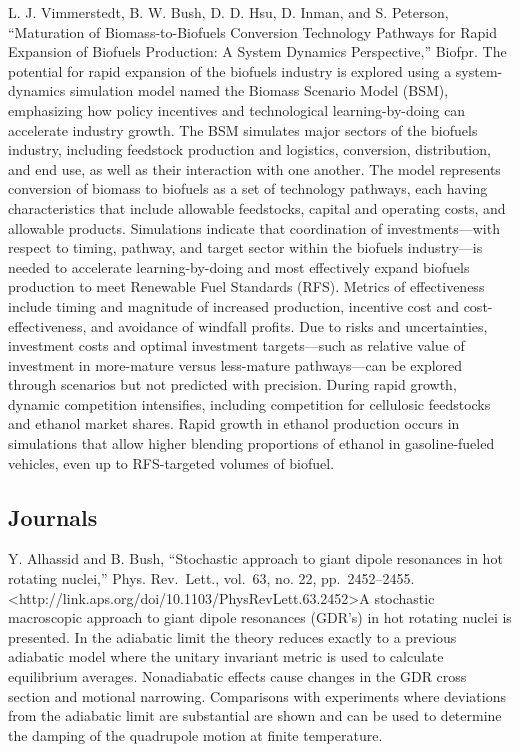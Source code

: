 \documentclass[]{article}
\begin{document}
L. J. Vimmerstedt, B. W. Bush, D. D. Hsu, D. Inman, and S. Peterson,
``Maturation of Biomass-to-Biofuels Conversion Technology Pathways for
Rapid Expansion of Biofuels Production: A System Dynamics Perspective,''
Biofpr. The potential for rapid expansion of the biofuels industry is
explored using a system-dynamics simulation model named the Biomass
Scenario Model (BSM), emphasizing how policy incentives and
technological learning-by-doing can accelerate industry growth. The BSM
simulates major sectors of the biofuels industry, including feedstock
production and logistics, conversion, distribution, and end use, as well
as their interaction with one another. The model represents conversion
of biomass to biofuels as a set of technology pathways, each having
characteristics that include allowable feedstocks, capital and operating
costs, and allowable products. Simulations indicate that coordination of
investments---with respect to timing, pathway, and target sector within
the biofuels industry---is needed to accelerate learning-by-doing and
most effectively expand biofuels production to meet Renewable Fuel
Standards (RFS). Metrics of effectiveness include timing and magnitude
of increased production, incentive cost and cost-effectiveness, and
avoidance of windfall profits. Due to risks and uncertainties,
investment costs and optimal investment targets---such as relative value
of investment in more-mature versus less-mature pathways---can be
explored through scenarios but not predicted with precision. During
rapid growth, dynamic competition intensifies, including competition for
cellulosic feedstocks and ethanol market shares. Rapid growth in ethanol
production occurs in simulations that allow higher blending proportions
of ethanol in gasoline-fueled vehicles, even up to RFS-targeted volumes
of biofuel.

\subsection{Journals}\label{journals}

Y. Alhassid and B. Bush, ``Stochastic approach to giant dipole
resonances in hot rotating nuclei,'' Phys. Rev.~Lett., vol.~63, no. 22,
pp.~2452--2455.
\textless{}http://link.aps.org/doi/10.1103/PhysRevLett.63.2452\textgreater{}A
stochastic macroscopic approach to giant dipole resonances (GDR's) in
hot rotating nuclei is presented. In the adiabatic limit the theory
reduces exactly to a previous adiabatic model where the unitary
invariant metric is used to calculate equilibrium averages. Nonadiabatic
effects cause changes in the GDR cross section and motional narrowing.
Comparisons with experiments where deviations from the adiabatic limit
are substantial are shown and can be used to determine the damping of
the quadrupole motion at finite temperature.
\end{document}
